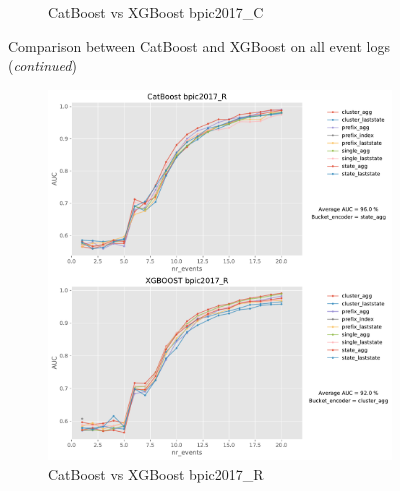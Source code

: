\begin{figure}[!htb]
\begin{subfigure}{0.48\textwidth}
		\caption{CatBoost vs XGBoost bpic2017\_C} \label{fig:b17c}
	\end{subfigure}
	\caption{Comparison between CatBoost and XGBoost on all event logs (\textit{continued})}
\label{fig:r2}
\end{figure}


\begin{figure}[!htb] %
	
	\begin{subfigure}{0.48\textwidth}
		\includegraphics[width=\linewidth]{images/catboost/graphs/bpic2017_R_CatBoost_xgboost.pdf}
		\caption{CatBoost vs XGBoost bpic2017\_R} \label{fig:b17r}
	\end{subfigure}\hspace*{\fill}
	\begin{subfigure}{0.48\textwidth}

\end{subfigure}
\end{figure}
